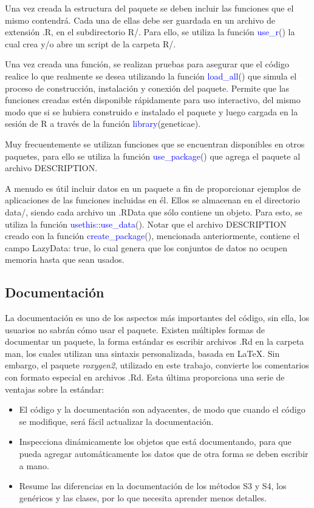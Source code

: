 Una vez creada la estructura del paquete se deben incluir las funciones que el mismo contendrá. Cada una de ellas debe ser guardada en un archivo de extensión .R, en el subdirectorio R/. Para ello, se utiliza la función \textcolor{blue}{use\_r}() la cual crea y/o abre un script de la carpeta R/.

Una vez creada una función, se realizan pruebas para asegurar que el código realice lo que realmente se desea utilizando la función \textcolor{blue}{load\_all}() que simula el proceso de construcción, instalación y conexión del paquete. Permite que las funciones creadas estén disponible rápidamente para uso interactivo, del mismo modo que si se hubiera construido e instalado el paquete y luego cargada en la sesión de R a través de la función \textcolor{blue}{library}(geneticae).

Muy frecuentemente se utilizan funciones que se encuentran disponibles en otros paquetes, para ello se utiliza la función \textcolor{blue}{use\_package}() que agrega el paquete al archivo DESCRIPTION.

A menudo es útil incluir datos en un paquete a fin de proporcionar ejemplos de aplicaciones de las funciones incluidas en él. Ellos se almacenan en el directorio data/, siendo cada archivo un .RData que sólo contiene un objeto. Para esto, se utiliza la función \textcolor{blue}{usethis::use\_data}(). Notar que el archivo DESCRIPTION creado con la función \textcolor{blue}{create\_package}(), mencionada anteriormente, contiene el campo LazyData: true, lo cual genera que los conjuntos de datos no ocupen memoria hasta que sean usados.

\subsection{Documentación}

La documentación es uno de los aspectos más importantes del código, sin ella, los usuarios no sabrán cómo usar el paquete. Existen múltiples formas de documentar un paquete, la forma estándar es escribir archivos .Rd en la carpeta man, los cuales utilizan una sintaxis personalizada, basada en LaTeX. Sin embargo, el paquete \emph{roxygen2}, utilizado en este trabajo, convierte los comentarios con formato especial en archivos .Rd. Esta última proporciona una serie de ventajas sobre la estándar:

\begin{itemize}
\item El código y la documentación son adyacentes, de modo que cuando el código se modifique, será fácil actualizar la documentación.

\item Inspecciona dinámicamente los objetos que está documentando, para que pueda agregar automáticamente los datos que de otra forma se deben escribir a mano.

\item Resume las diferencias en la documentación de los métodos S3 y S4, los genéricos y las clases, por lo que necesita aprender menos detalles.
\end{itemize}

